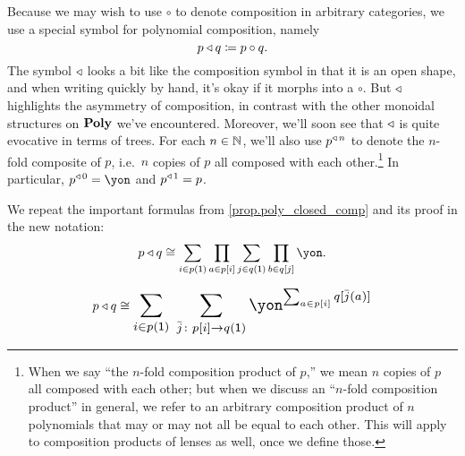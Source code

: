 \documentclass[Book-Poly]{subfiles}
\begin{document}
Because we may wish to use $\circ$ to denote composition in arbitrary categories, we use a special symbol for polynomial composition, namely
\[
p\mathbin{\triangleleft} q\coloneqq p\circ q.
\]
The symbol $\mathbin{\triangleleft}$ looks a bit like the composition symbol in that it is an open shape, and when writing quickly by hand, it's okay if it morphs into a $\circ$.
But $\mathbin{\triangleleft}$ highlights the asymmetry of composition, in contrast with the other monoidal structures on $\mathbf{Poly}$ we've encountered.
Moreover, we'll soon see that $\mathbin{\triangleleft}$ is quite evocative in terms of trees.
For each $n\in\mathbb{N}$, we'll also use $p^{\mathbin{\triangleleft}\,n}$ to denote the $n$-fold composite of $p$, i.e.\ $n$ copies of $p$ all composed with each other.\footnote{When we say ``the $n$-fold composition product of $p$,'' we mean $n$ copies of $p$ all composed with each other; but when we discuss an ``$n$-fold composition product'' in general, we refer to an arbitrary composition product of $n$ polynomials that may or may not all be equal to each other. This will apply to composition products of lenses as well, once we define those.}
In particular, $p\tripow0=\yon$ and $p^{\mathbin{\triangleleft}\,1}=p$.

We repeat the important formulas from \cref{prop.poly_closed_comp} and its proof in the new notation:
\begin{equation}\label{eqn.composite_formula}
p\tri q\iso\sum_{i\in p(\1)}\prod_{a\in p[i]}\sum_{j\in q(\1)}\prod_{b\in q[j]}\yon.
\end{equation}

\begin{align}\label{eqn.composite_formula_sums_first}
  p\tri q\iso
  \scalebox{1.3}{$\displaystyle
  \sum_{i\in p(\1)} \; \sum_{\bar{j}\colon p[i]\to q(\1)}\yon^{\sum_{a\in p[i]}q[\bar{j}(a)]}$}
\end{align}

\end{document}

